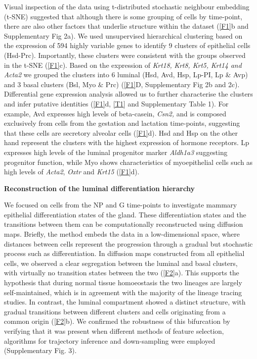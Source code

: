 \documentclass[titlepage, 12pt, oneside]{amsart}
\begin{document}
Visual inspection of the data using t-distributed stochastic neighbour embedding (t-SNE) suggested that although there is some grouping of cells by time-point, there are also other factors that underlie structure within the dataset (\autoref{F1}b and Supplementary Fig 2a).
We used unsupervised hierarchical clustering based on the expression of 594 highly variable genes to identify 9 clusters of epithelial cells (Hsd-Prc).
Importantly, these clusters were consistent with the groups observed in the t-SNE (\autoref{F1}c).
Based on the expression of \textit{Krt18,} \textit{Krt8, Krt5, Krt14 and Acta2} we grouped the clusters into 6 luminal (Hsd, Avd, Hsp, Lp-PI, Lp \& Avp) and 3 basal clusters (Bsl, Myo \& Prc) (\autoref{F1}D, Supplementary Fig 2b and 2c).
Differential gene expression analysis allowed us to further characterise the clusters and infer putative identities (\autoref{F1}d, \autoref{T1} and Supplementary Table 1).
For example, Avd expresses high levels of beta-casein, \textit{Csn2,} and is composed exclusively from cells from the gestation and lactation time-points, suggesting that these cells are secretory alveolar cells (\autoref{F1}d).
Hsd and Hsp on the other hand represent the clusters with the highest expression of hormone receptors.
Lp expresses high levels of the luminal progenitor marker \textit{Aldh1a3} suggesting progenitor function, while Myo shows characteristics of myoepithelial cells such as high levels of \textit{Acta2}, \textit{Oxtr} and \textit{Krt15} (\autoref{F1}d).

\textbf{Reconstruction of the luminal differentiation hierarchy}

We focused on cells from the NP and G time-points to investigate mammary epithelial differentiation states of the gland.
These differentiation states and the transitions between them can be computationally reconstructed using diffusion maps.
Briefly, the method embeds the data in a low-dimensional space, where distances between cells represent the progression through a gradual but stochastic process such as differentiation.
In diffusion maps constructed from all epithelial cells, we observed a clear segregation between the luminal and basal clusters, with virtually no transition states between the two (\autoref{F2}a).
This supports the hypothesis that during normal tissue homoeostasis the two lineages are largely self-maintained, which is in agreement with the majority of the lineage tracing studies\autocite{VanKeymeulen2011,VanAmerongen2012,Davis2016}.
In contrast, the luminal compartment showed a distinct structure, with gradual transitions between different clusters and cells originating from a common origin (\autoref{F2}b).
We confirmed the robustness of this bifurcation by verifying that it was present when different methods of feature selection, algorithms for trajectory inference and down-sampling were employed (Supplementary Fig. 3).
\end{document}

